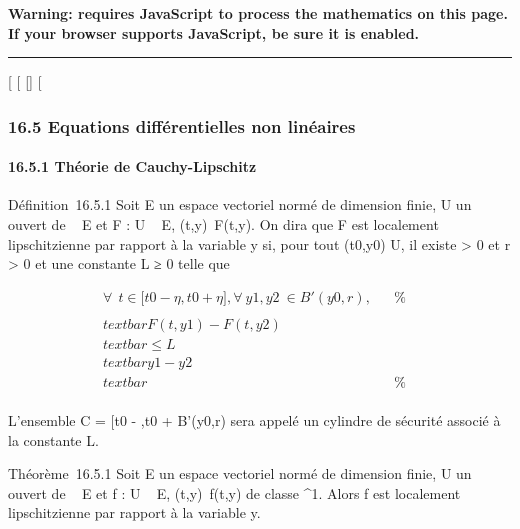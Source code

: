 \textbf{Warning: 
requires JavaScript to process the mathematics on this page.\\ If your
browser supports JavaScript, be sure it is enabled.}

\begin{center}\rule{3in}{0.4pt}\end{center}

{[}
{[}
{[}{]}
{[}

\subsubsection{16.5 Equations différentielles non linéaires}

\paragraph{16.5.1 Théorie de Cauchy-Lipschitz}

Définition~16.5.1 Soit E un espace vectoriel normé de dimension finie, U
un ouvert de ~ \times E et F : U \rightarrow~ E,
(t,y)\mapsto~F(t,y). On dira que F est localement
lipschitzienne par rapport à la variable y si, pour tout
(t0,y0) \in U, il existe \eta \textgreater{} 0 et r
\textgreater{} 0 et une constante L ≥ 0 telle que

\begin{align*} \forall~~t \in
{[}t0 - \eta,t0 + \eta{]},
\forall~y1,y2~ \in
B'(y0,r),& & \%& \\
\\textbar{}F(t,y1) -
F(t,y2)\\textbar{} \leq
L\\textbar{}y1 -
y2\\textbar{}& & \%&
\\ \end{align*}

L'ensemble C = {[}t0 - \eta,t0 + \eta{]} \times
B'(y0,r) sera appelé un cylindre de sécurité associé à la
constante L.

Théorème~16.5.1 Soit E un espace vectoriel normé de dimension finie, U
un ouvert de ~ \times E et f : U \rightarrow~ E, (t,y)\mapsto~f(t,y)
de classe ^1. Alors f est localement lipschitzienne par
rapport à la variable y.

